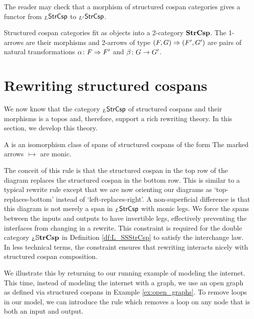\documentclass[oneside]{amsart}
\begin{document}
The reader may check that a morphism of structured cospan
categories gives a functor from $_L\mathsf{StrCsp} $ to
$ _{L'}\mathsf{StrCsp} $. 

Structured cospan categories fit as objects into a
2-category $ \mathbf{StrCsp} $. The 1-arrows are their morphisms
and 2-arrows of type $ (F,G) \Rightarrow (F',G') $ are pairs of
natural transformations $ \alpha \colon F \Rightarrow F' $ and
$ \beta \colon G \to G'$.


\section{Rewriting structured cospans}
\label{sec:RewritingStrCsp}

We now know that the category $ _L\mathsf{StrCsp} $ of
structured cospans and their morphisms is a topos
and, therefore, support a rich rewriting
theory. In this section, we develop this theory.

\begin{definition}
  A  is an
  isomorphism class of spans of structured cospans of the
  form  The marked arrows $ \rightarrowtail $ are
  monic.
\end{definition}

The conceit of this rule is that the structured
cospan in the top row of the diagram replaces the
structured cospan in the bottom row. This is
similar to a typical rewrite rule except that we
are now orienting our diagrams as
`top-replaces-bottom' instead of
`left-replaces-right'.  A non-superficial
difference is that this diagram is not merely a
span in $ _L\mathsf{StrCsp} $ with monic legs.  We force
the spans between the inputs and outputs to have
invertible legs, effectively preventing the
interfaces from changing in a rewrite.  This
constraint is required for the double category
$ _L\mathbb{S} \mathbf{trCsp} $ in Definition \ref{df:L_SSStrCsp}
to satisfy the interchange law. In less technical
terms, the constraint ensures that rewriting interacts nicely
with structured cospan composition.

\begin{example}
  We illustrate this by returning to our running
  example of modeling the internet. This time,
  instead of modeling the internet with a graph,
  we use an open graph as defined via structured
  cospans in Example \ref{ex:open_graphs}. To
  remove loops in our model, we can introduce the
  rule  which
  removes a loop on any node that is both an input
  and output.
\end{example}
\end{document}
